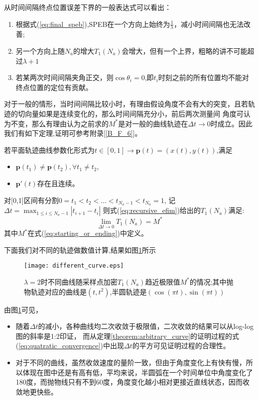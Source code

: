 从时间间隔终点位置误差下界的一般表达式可以看出：
\begin{enumerate}
  \item 根据式(\ref{eq:final_speb}),SPEB在一个方向上始终为$\frac{1}{\lambda}$，减小时间间隔也无法改善;
  \item 另一个方向上随$N_a$的增大$T_1(N_a)$会增大，但有一个上界，粗略的讲不可能超过$\lambda+1$
  \item 若某两次时间间隔夹角正交，则$\cos\theta_i=0$,即$t_i$时刻之前的所有位置均不能对终点位置的定位有贡献。
\end{enumerate}
对于一般的情形，当时间间隔比较小时，有理由假设角度不会有大的突变，且若轨迹的切向量如果是连续变化的，那么时间间隔充分小，前后两次测量间
角度可认为不变，那么有理由认为之前求的$M^*$是对一般的曲线轨迹在$\Delta t\to 0$时成立。因此我们有如下定理,证明可参考附录[\ref{B_F_6}]。
\begin{theorem}\label{theorem:arbitrary_curve}
若平面轨迹曲线参数化形式为$t\in[0,1]\rightarrow \bm{p}(t)=(x(t),y(t))$,满足
\begin{itemize}
\item $\bm{p}(t_1)\neq \bm{p}(t_2),\forall t_1\neq t_2$,
\item $\bm{p}'(t)$存在且连续。
\end{itemize}
对[0,1]区间有分割$0=t_1<t_2<\dots<t_{N_a-1}<t_{N_a}=1$,
记$\Delta t=\max_{1\leq i\leq N_a-1}|t_{i+1}-t_i|$
则式(\ref{eq:recursive_efim})给出的$T_1(N_a)$满足:
\begin{equation}\label{eq:limiting_cf}
\lim_{\Delta t\to 0}T_1(N_a)=M^*
\end{equation}
其中$M^*$在式(\ref{eq:starting_or_ending})中定义。
\end{theorem}

下面我们对不同的轨迹做数值计算,结果如图\ref{figure:tend_to_limit}所示
\begin{figure}
  \centering
  \texttt{[image: different\_curve.eps]}
  \caption{$\lambda=2$时不同曲线随采样点加密$T_1(N_a)$趋近极限值$M^*$的情况;其中抛物轨迹对应的曲线是$(t,t^2)$,半圆轨迹是$(\cos(\pi t),\sin(\pi t))$}\label{figure:tend_to_limit}
\end{figure}

由图\ref{figure:tend_to_limit}可见，
\begin{itemize}
  \item 随着$\Delta t$的减小，各种曲线均二次收敛于极限值，二次收敛的结果可以从log-log图的斜率是1:2印证，
而从定理\ref{theorem:arbitrary_curve}的证明过程的式(\ref{eq:quatratic_convergence})中出现$\Delta t$的平方可见证明过程的合理性。
  \item 对于不同的曲线，虽然收敛速度的量阶一致，但由于角度变化上有快有慢，所以体现在图中还是有高有低，平均来说，半圆弧在一个时间单位中角度变化了180度，而抛物线只有不到60度，角度变化越小相对更接近直线状态，因而收敛地更快些。
\end{itemize}


